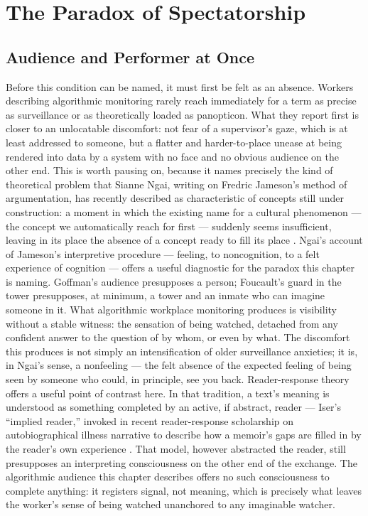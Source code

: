 \documentclass[10pt]{article}
\begin{document}
\section{The Paradox of Spectatorship}

\subsection{Audience and Performer at Once}

Before this condition can be named, it must first be felt as an absence. Workers describing algorithmic monitoring rarely reach immediately for a term as precise as surveillance or as theoretically loaded as panopticon. What they report first is closer to an unlocatable discomfort: not fear of a supervisor's gaze, which is at least addressed to someone, but a flatter and harder-to-place unease at being rendered into data by a system with no face and no obvious audience on the other end. This is worth pausing on, because it names precisely the kind of theoretical problem that Sianne Ngai, writing on Fredric Jameson's method of argumentation, has recently described as characteristic of concepts still under construction: a moment in which the existing name for a cultural phenomenon --- the concept we automatically reach for first --- suddenly seems insufficient, leaving in its place the absence of a concept ready to fill its place \cite{ngai}. Ngai's account of Jameson's interpretive procedure --- feeling, to noncognition, to a felt experience of cognition --- offers a useful diagnostic for the paradox this chapter is naming. Goffman's audience presupposes a person; Foucault's guard in the tower presupposes, at minimum, a tower and an inmate who can imagine someone in it. What algorithmic workplace monitoring produces is visibility without a stable witness: the sensation of being watched, detached from any confident answer to the question of by whom, or even by what. The discomfort this produces is not simply an intensification of older surveillance anxieties; it is, in Ngai's sense, a nonfeeling --- the felt absence of the expected feeling of being seen by someone who could, in principle, see you back. Reader-response theory offers a useful point of contrast here. In that tradition, a text's meaning is understood as something completed by an active, if abstract, reader --- Iser's ``implied reader,'' invoked in recent reader-response scholarship on autobiographical illness narrative to describe how a memoir's gaps are filled in by the reader's own experience \cite{vailankanni}. That model, however abstracted the reader, still presupposes an interpreting consciousness on the other end of the exchange. The algorithmic audience this chapter describes offers no such consciousness to complete anything: it registers signal, not meaning, which is precisely what leaves the worker's sense of being watched unanchored to any imaginable watcher.
\end{document}
